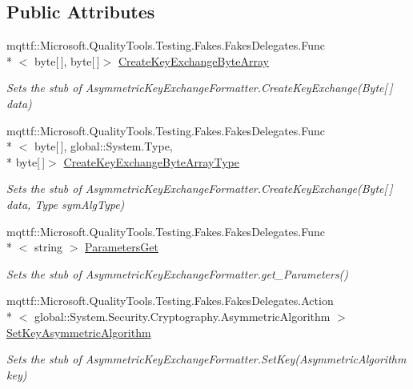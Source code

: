\subsection*{Public Attributes}
\begin{DoxyCompactItemize}
\item 
mqttf\-::\-Microsoft.\-Quality\-Tools.\-Testing.\-Fakes.\-Fakes\-Delegates.\-Func\\*
$<$ byte\mbox{[}$\,$\mbox{]}, byte\mbox{[}$\,$\mbox{]}$>$ \hyperlink{class_system_1_1_security_1_1_cryptography_1_1_fakes_1_1_stub_asymmetric_key_exchange_formatter_af389516524d939d79f5548e9580e1bc4}{Create\-Key\-Exchange\-Byte\-Array}
\begin{DoxyCompactList}\small\item\em Sets the stub of Asymmetric\-Key\-Exchange\-Formatter.\-Create\-Key\-Exchange(\-Byte\mbox{[}$\,$\mbox{]} data)\end{DoxyCompactList}\item 
mqttf\-::\-Microsoft.\-Quality\-Tools.\-Testing.\-Fakes.\-Fakes\-Delegates.\-Func\\*
$<$ byte\mbox{[}$\,$\mbox{]}, global\-::\-System.\-Type, \\*
byte\mbox{[}$\,$\mbox{]}$>$ \hyperlink{class_system_1_1_security_1_1_cryptography_1_1_fakes_1_1_stub_asymmetric_key_exchange_formatter_a5836ed631a416b9efb56d5c253fdbe05}{Create\-Key\-Exchange\-Byte\-Array\-Type}
\begin{DoxyCompactList}\small\item\em Sets the stub of Asymmetric\-Key\-Exchange\-Formatter.\-Create\-Key\-Exchange(\-Byte\mbox{[}$\,$\mbox{]} data, Type sym\-Alg\-Type)\end{DoxyCompactList}\item 
mqttf\-::\-Microsoft.\-Quality\-Tools.\-Testing.\-Fakes.\-Fakes\-Delegates.\-Func\\*
$<$ string $>$ \hyperlink{class_system_1_1_security_1_1_cryptography_1_1_fakes_1_1_stub_asymmetric_key_exchange_formatter_af4415a202b7c8385e5e1d493a625774f}{Parameters\-Get}
\begin{DoxyCompactList}\small\item\em Sets the stub of Asymmetric\-Key\-Exchange\-Formatter.\-get\-\_\-\-Parameters()\end{DoxyCompactList}\item 
mqttf\-::\-Microsoft.\-Quality\-Tools.\-Testing.\-Fakes.\-Fakes\-Delegates.\-Action\\*
$<$ global\-::\-System.\-Security.\-Cryptography.\-Asymmetric\-Algorithm $>$ \hyperlink{class_system_1_1_security_1_1_cryptography_1_1_fakes_1_1_stub_asymmetric_key_exchange_formatter_af326864d5558baad9393a0b11c508ed7}{Set\-Key\-Asymmetric\-Algorithm}
\begin{DoxyCompactList}\small\item\em Sets the stub of Asymmetric\-Key\-Exchange\-Formatter.\-Set\-Key(\-Asymmetric\-Algorithm key)\end{DoxyCompactList}\end{DoxyCompactItemize}
